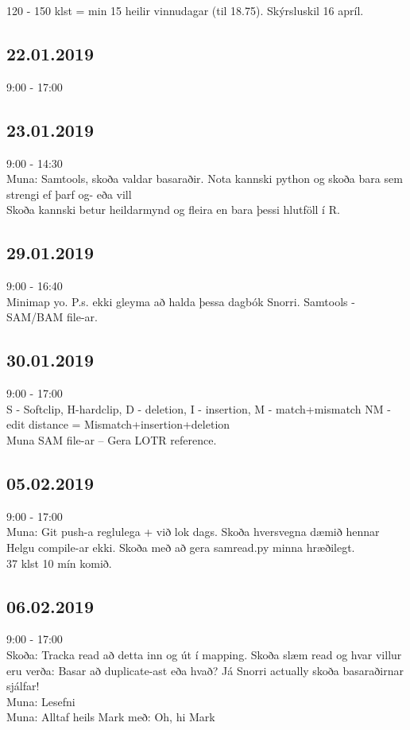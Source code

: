 \documentclass{article}
\begin{document}
120 - 150 klst = min 15 heilir vinnudagar (til 18.75). Skýrsluskil 16 apríl.

\subsection*{22.01.2019}
9:00 - 17:00

\subsection*{23.01.2019}
9:00 - 14:30 \\
Muna:
Samtools, skoða valdar basaraðir. Nota kannski python og skoða bara sem  strengi ef þarf og- eða vill \\
Skoða kannski betur heildarmynd og fleira en bara þessi hlutföll í R.

\subsection*{29.01.2019}
9:00 - 16:40 \\
Minimap yo. P.s. ekki gleyma að halda þessa dagbók Snorri. Samtools - SAM/BAM file-ar.

\subsection*{30.01.2019}
9:00 - 17:00 \\
S - Softclip, H-hardclip, D - deletion, I - insertion, M - match+mismatch
NM - edit distance = Mismatch+insertion+deletion \\
Muna SAM file-ar -- Gera LOTR reference.

\subsection*{05.02.2019}
9:00 - 17:00\\
Muna: Git push-a reglulega + við lok dags. Skoða hversvegna dæmið hennar Helgu compile-ar ekki. Skoða með að gera samread.py minna hræðilegt. \\
37 klst 10 mín komið.

\subsection*{06.02.2019}
9:00 - 17:00\\
Skoða: Tracka read að detta inn og út í mapping. Skoða slæm read og hvar villur eru verða: Basar að duplicate-ast eða hvað? Já Snorri actually skoða basaraðirnar sjálfar! \\
Muna: Lesefni \\
Muna: Alltaf heils Mark með: Oh, hi Mark
\end{document}
